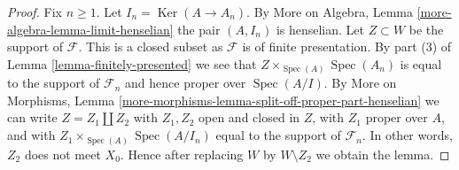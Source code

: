 \documentclass[10pt,a4paper]{amsart}
\theoremstyle{plain}
\theoremstyle{definition}
\theoremstyle{remark}
\numberwithin{equation}{subsection}
\def\Spec{\mathop{\mathrm{Spec}}}
\def\Ker{\mathop{\mathrm{Ker}}}
\begin{document}
\begin{proof}
Fix $n \geq 1$. Let $I_n = \Ker(A \to A_n)$.
By More on Algebra, Lemma \ref{more-algebra-lemma-limit-henselian}
the pair $(A, I_n)$ is henselian.
Let $Z \subset W$ be the support of $\mathcal{F}$.
This is a closed subset as $\mathcal{F}$ is of finite presentation.
By part (3) of Lemma \ref{lemma-finitely-presented}
we see that $Z \times_{\Spec(A)} \Spec(A_n)$
is equal to the support of $\mathcal{F}_n$ and hence
proper over $\Spec(A/I)$.
By More on Morphisms, Lemma
\ref{more-morphisms-lemma-split-off-proper-part-henselian}
we can write $Z = Z_1 \amalg Z_2$ with $Z_1, Z_2$ open and
closed in $Z$, with $Z_1$ proper
over $A$, and with $Z_1 \times_{\Spec(A)} \Spec(A/I_n)$
equal to the support of $\mathcal{F}_n$.
In other words, $Z_2$ does not meet $X_0$.
Hence after replacing $W$ by $W \setminus Z_2$ we obtain the lemma.
\end{proof}
\end{document}
